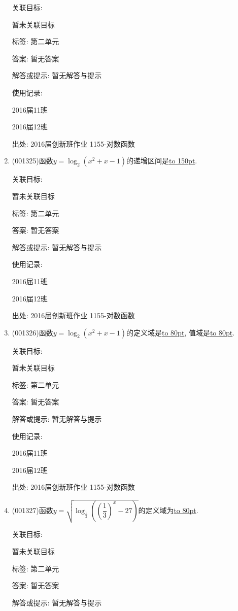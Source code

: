 \documentclass[10pt,a4paper]{article}
\newcommand{\blank}[1]{\underline{\hbox to #1pt{}}}
\begin{document}
\begin{enumerate}[1.]
关联目标:

暂未关联目标



标签: 第二单元

答案: 暂无答案

解答或提示: 暂无解答与提示

使用记录:

2016届11班	

2016届12班	


出处: 2016届创新班作业	1155-对数函数
\item { (001325)}函数$y=\log_2(x^2+x-1)$的递增区间是\blank{150}.


关联目标:

暂未关联目标



标签: 第二单元

答案: 暂无答案

解答或提示: 暂无解答与提示

使用记录:

2016届11班	

2016届12班	


出处: 2016届创新班作业	1155-对数函数
\item { (001326)}函数$y=\log_2(x^2+x-1)$的定义域是\blank{80}, 值域是\blank{80}.


关联目标:

暂未关联目标



标签: 第二单元

答案: 暂无答案

解答或提示: 暂无解答与提示

使用记录:

2016届11班	

2016届12班	


出处: 2016届创新班作业	1155-对数函数
\item { (001327)}函数$y=\sqrt{\log_{\frac{1}{2}}\left(\left(\dfrac{1}{3}\right)^x-27\right)}$的定义域为\blank{80}.


关联目标:

暂未关联目标



标签: 第二单元

答案: 暂无答案

解答或提示: 暂无解答与提示


\end{enumerate}
\end{document}
